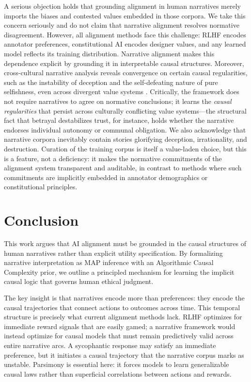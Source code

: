\documentclass{article}
\theoremstyle{plain}
\theoremstyle{definition}
\theoremstyle{remark}
\begin{document}
A serious objection holds that grounding alignment in human narratives merely imports the biases and contested values embedded in those corpora. We take this concern seriously and do not claim that narrative alignment resolves normative disagreement. However, all alignment methods face this challenge: RLHF encodes annotator preferences, constitutional AI encodes designer values, and any learned model reflects its training distribution. Narrative alignment makes this dependence explicit by grounding it in interpretable causal structures. Moreover, cross-cultural narrative analysis reveals convergence on certain causal regularities, such as the instability of deception and the self-defeating nature of pure selfishness, even across divergent value systems \cite{macintyre81}. Critically, the framework does not require narratives to agree on normative conclusions; it learns the \textit{causal regularities} that persist across culturally conflicting value systems---the structural fact that betrayal destabilizes trust, for instance, holds whether the narrative endorses individual autonomy or communal obligation. We also acknowledge that narrative corpora inevitably contain stories glorifying deception, irrationality, and destruction. Curation of the training corpus is itself a value-laden choice, but this is a feature, not a deficiency: it makes the normative commitments of the alignment system transparent and auditable, in contrast to methods where such commitments are implicitly embedded in annotator demographics or constitutional principles.

\section{Conclusion}

This work argues that AI alignment must be grounded in the causal structures of human narratives rather than explicit utility specification. By formalizing narrative interpretation as MAP inference with an Algorithmic Causal Complexity prior, we outline a principled mechanism for learning the implicit causal logic that governs human ethical judgment.

The key insight is that narratives encode more than preferences: they encode the causal trajectories that connect actions to outcomes across time. This temporal structure is precisely what current alignment methods lack. RLHF optimizes for immediate reward signals that are easily gamed; a narrative framework would instead optimize for causal models that must remain predictively valid across entire narrative arcs. A sycophantic response may satisfy an immediate preference, but it initiates a causal trajectory that the narrative corpus marks as unstable. Parsimony is essential here: it forces models to learn generalizable causal laws rather than superficial correlations between actions and rewards.
\end{document}
